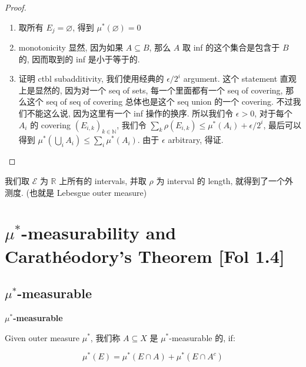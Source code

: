 \documentclass{qlnotes-export}
\begin{document}
\begin{proof}

\begin{enumerate}
\item
  取所有 \(E_{j} = \varnothing\), 得到 \(\mu^{\ast}(\varnothing) = 0\)
\item
  monotonicity 显然, 因为如果 \(A \subseteq B\), 那么 \(A\) 取 inf 的这个集合是包含于 \(B\) 的, 因而取到的 inf 是小于等于的.
\item
  证明 ctbl subadditivity, 我们使用经典的 \(\epsilon/2^{i}\) argument. 这个 statement 直观上是显然的, 因为对一个 seq of sets, 每一个里面都有一个 seq of covering, 那么这个 seq of seq of covering 总体也是这个 seq union 的一个 covering. 不过我们不能这么说, 因为这里有一个 inf 操作的换序. 所以我们令 \(\epsilon > 0\), 对于每个 \(A_{i}\) 的 covering \((E_{i,k})_{k \in {\mathbb{N}}}\), 我们令 \(\sum_{k}\rho(E_{i,k}) \leq \mu^{\ast}(A_{i}) + \epsilon/2^{i}\), 最后可以得到 \(\mu^{\ast}(\bigcup_{i}A_{i}) \leq \sum_{i}\mu^{\ast}(A_{i})\). 由于 \(\epsilon\) arbitrary, 得证.
\end{enumerate}

\end{proof}

\begin{example}

我们取 \(\mathcal{E}\) 为 \(\mathbb{R}\) 上所有的 intervals, 并取 \(\rho\) 为 interval 的 length, 就得到了一个外测度. (也就是 Lebesgue outer measure)

\end{example}

\section{\texorpdfstring{\(\mu^{\ast}\)-measurability and Carathéodory's Theorem {[}Fol 1.4{]}}{\textbackslash mu\^{}\{\textbackslash ast\}-measurability and Carathéodory's Theorem {[}Fol 1.4{]}}}

\subsection{\texorpdfstring{\(\mu^{\ast}\)-measurable}{\textbackslash mu\^{}\{\textbackslash ast\}-measurable}}\label{muast-measurable}

\begin{definition}{\protect{}\label{kn-mu-measurable}{\textbf{\(\mu^{\ast}\)-measurable}}}

Given outer measure \(\mu^{\ast}\), 我们称 \(A \subseteq X\) 是 \(\mu^{\ast}\)-measurable 的, if:

\[\mu^{\ast}(E) = \mu^{\ast}(E \cap A) + \mu^{\ast}(E \cap A^{c})\]

\end{definition}
\end{document}
